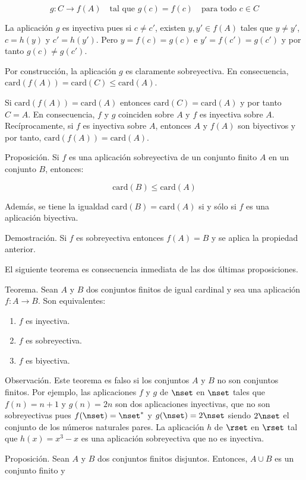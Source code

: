 $$ g: C \longrightarrow f(A) \quad \text{tal que } g(c) = f(c) \quad
\text{para todo } c \in C $$

La aplicación $g$ es inyectiva pues si $c \neq c'$, existen $y, y' \in f(A)$
tales que $y \neq y'$, $c = h(y)$ y $c' = h(y')$. Pero $y = f(c) = g(c)$ e
$y' = f(c') = g(c')$ y por tanto $g(c) \neq g(c')$.

Por construcción, la aplicación $g$ es claramente sobreyectiva.  En
consecuencia, $\text{card}(f(A)) = \text{card}(C) \leq \text{card}(A)$.

Si $\text{card}(f(A)) = \text{card}(A)$ entonces $\text{card}(C) =
\text{card}(A)$ y por tanto $C = A$. En consecuencia, $f$ y $g$ coinciden
sobre $A$ y $f$ es inyectiva sobre $A$. Recíprocamente, si $f$ es inyectiva
sobre $A$, entonces $A$ y $f(A)$ son biyectivos y por tanto,
$\text{card}(f(A)) = \text{card}(A)$.

Proposición. Si $f$ es una aplicación sobreyectiva de un conjunto finito $A$
en un conjunto $B$, entonces:

$$ \text{card}(B) \leq \text{card}(A) $$

Además, se tiene la igualdad $\text{card}(B) = \text{card}(A)$ si y sólo si
$f$ es una aplicación biyectiva.

Demostración. Si $f$ es sobreyectiva entonces $f(A) = B$ y se aplica la
propiedad anterior.

El siguiente teorema es consecuencia inmediata de las dos últimas
proposiciones.

Teorema. Sean $A$ y $B$ dos conjuntos finitos de igual cardinal y sea una
aplicación $f: A \longrightarrow B$. Son equivalentes:

\begin{enumerate}
  \item $f$ es inyectiva.
  \item $f$ es sobreyectiva.
  \item $f$ es biyectiva.
\end{enumerate}

Observación. Este teorema es falso si los conjuntos $A$ y $B$ no son
conjuntos finitos. Por ejemplo, las aplicaciones $f$ y $g$ de $\nset$ en
$\nset$ tales que $f(n) = n + 1$ y $g(n) = 2n$ son dos aplicaciones
inyectivas, que no son sobreyectivas pues $f(\nset) = \nset^*$ y $g(\nset) =
2\nset$ siendo $2\nset$ el conjunto de los números naturales pares. La
aplicación $h$ de $\rset$ en $\rset$ tal que $h(x) = x^3 - x$ es una
aplicación sobreyectiva que no es inyectiva.

Proposición. Sean $A$ y $B$ dos conjuntos finitos disjuntos. Entonces, $A
\cup B$ es un conjunto finito y 

